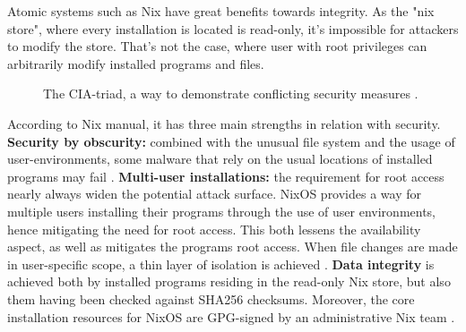 Atomic systems such as Nix have great benefits towards integrity. As
the "nix store", where every installation is located is read-only,
it's impossible for attackers to modify the store. That's not the
case, where user with root privileges can arbitrarily modify installed
programs and files.

\begin{figure}[t!]
\centerline{}
\caption{The CIA-triad, a way to demonstrate conflicting security
  measures \cite{hughes2013quantitative}.}
\label{ciatriad}
\end{figure}

According to Nix manual, it has three main strengths in relation with
security. \textbf{Security by obscurity: }combined with the unusual
file system and the usage of user-environments, some malware that rely
on the usual locations of installed programs may fail
\cite{nixosSecurityNixOS}. \textbf{Multi-user installations: }the
requirement for root access nearly always widen the potential attack
surface. NixOS provides a way for multiple users installing their
programs through the use of user environments, hence mitigating the
need for root access. This both lessens the availability aspect, as
well as mitigates the programs root access. When file changes are made
in user-specific scope, a thin layer of isolation is
achieved \cite{nixosNixOSManual}. \textbf{Data integrity} is achieved
both by installed programs residing in the read-only Nix store, but
also them having been checked against SHA256 checksums. Moreover, the
core installation resources for NixOS are GPG-signed by an
administrative Nix team \cite{nixosSecurityNixOS}.

